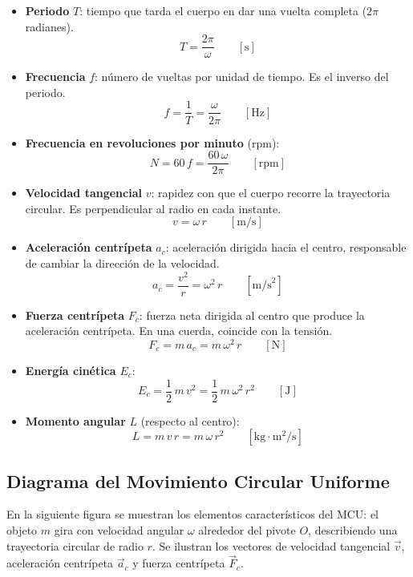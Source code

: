 \documentclass[12pt]{article}
\begin{document}
\begin{itemize}
  \item \textbf{Periodo} \(T\): tiempo que tarda el cuerpo en dar una vuelta completa (\(2\pi\) radianes).
  \[
  T = \frac{2\pi}{\omega} \qquad [\text{s}]
  \]
  \item \textbf{Frecuencia} \(f\): número de vueltas por unidad de tiempo. Es el inverso del periodo.
  \[
  f = \frac{1}{T} = \frac{\omega}{2\pi} \qquad [\text{Hz}]
  \]
  \item \textbf{Frecuencia en revoluciones por minuto} (rpm):
  \[
  N = 60\,f = \frac{60\,\omega}{2\pi} \qquad [\text{rpm}]
  \]
  \item \textbf{Velocidad tangencial} \(v\): rapidez con que el cuerpo recorre la trayectoria circular. Es perpendicular al radio en cada instante.
  \[
  v = \omega\,r \qquad [\text{m/s}]
  \]
  \item \textbf{Aceleración centrípeta} \(a_c\): aceleración dirigida hacia el centro, responsable de cambiar la dirección de la velocidad.
  \[
  a_c = \frac{v^2}{r} = \omega^2\,r \qquad [\text{m/s}^2]
  \]
  \item \textbf{Fuerza centrípeta} \(F_c\): fuerza neta dirigida al centro que produce la aceleración centrípeta. En una cuerda, coincide con la tensión.
  \[
  F_c = m\,a_c = m\,\omega^2\,r \qquad [\text{N}]
  \]
  \item \textbf{Energía cinética} \(E_c\):
  \[
  E_c = \frac{1}{2}\,m\,v^2 = \frac{1}{2}\,m\,\omega^2\,r^2 \qquad [\text{J}]
  \]
  \item \textbf{Momento angular} \(L\) (respecto al centro):
  \[
  L = m\,v\,r = m\,\omega\,r^2 \qquad [\text{kg}\cdot\text{m}^2/\text{s}]
  \]
\end{itemize}

\subsection*{Diagrama del Movimiento Circular Uniforme}

En la siguiente figura se muestran los elementos característicos del MCU: el objeto \(m\) gira con velocidad angular \(\omega\) alrededor del pivote \(O\), describiendo una trayectoria circular de radio \(r\). Se ilustran los vectores de velocidad tangencial \(\vec{v}\), aceleración centrípeta \(\vec{a}_c\) y fuerza centrípeta \(\vec{F}_c\).
\end{document}
